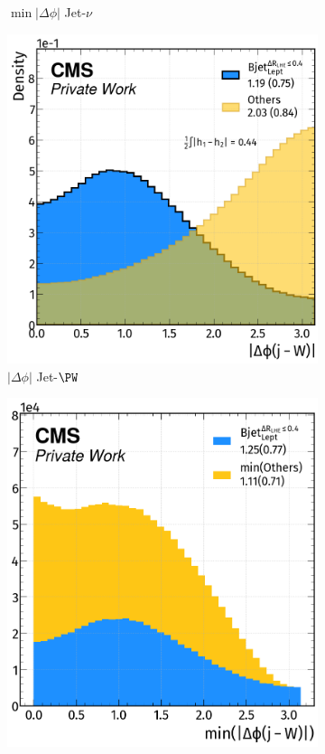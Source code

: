 \begin{figure}[H]
\begin{subfigure}{0.48\linewidth}
        \caption{$\min |\Delta \phi|$ Jet-$\nu$}
    \end{subfigure} 
    \hfill
    \begin{subfigure}{0.49\linewidth}
        \centering
        \includegraphics[width=1\linewidth]{fig//chap08-kin_reco/dphi_W.png}
        \caption{$|\Delta \phi|$ Jet-$\PW$}
    \end{subfigure}
    \hfill
    \begin{subfigure}{0.46\linewidth}  
        \centering
        \includegraphics[width=1\linewidth]{fig//chap08-kin_reco/min_dphi_W.png}

\end{subfigure}
\end{figure}
